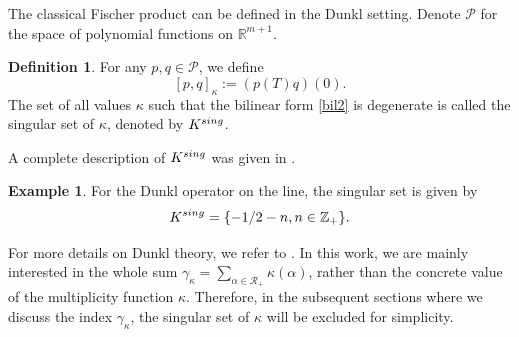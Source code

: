 \documentclass{amsart}
\theoremstyle{definition}
\newtheorem{definition}[theorem]{Definition}
\newtheorem{ex}[theorem]{Example}
\theoremstyle{remark}
\numberwithin{equation}{section}
\begin{document}
 The classical Fischer product can be defined in the Dunkl setting. Denote $\mathcal{P}$ for the space of polynomial functions on $\mathbb{R}^{m+1}$.
\begin{definition} \cite{ros} For any $p, q\in \mathcal{P}$, we define
\begin{equation} \label{bil2}
    [p, q]_{\kappa}:=(p(T)q)(0).
\end{equation}
  The set of all values $\kappa$ such that the bilinear form  \eqref{bil2} is degenerate is called  the singular set of $\kappa$, denoted by $K^{\rm sing}$.
\end{definition}

 A complete description of $K^{\rm sing}$ was given in \cite{ddo}.
 \begin{ex}
     For the Dunkl operator on the line, the singular set is given by
 \begin{equation*}
     K^{\rm sing}=\{-1/2-n, n\in \mathbb{Z}_{+}\}.
 \end{equation*}
 \end{ex}
 For more details on Dunkl theory, we refer to  \cite{dx1, ros}.  In this work, we are mainly interested in the whole sum $\gamma_{\kappa}=\sum_{\alpha\in \mathscr{R}_{+}}\kappa(\alpha)$, rather than the  concrete  value of the multiplicity function $\kappa$. Therefore,   in the subsequent sections where we  discuss the index $\gamma_{\kappa}$, the singular set of $\kappa$ will   be excluded for simplicity.
\end{document}
